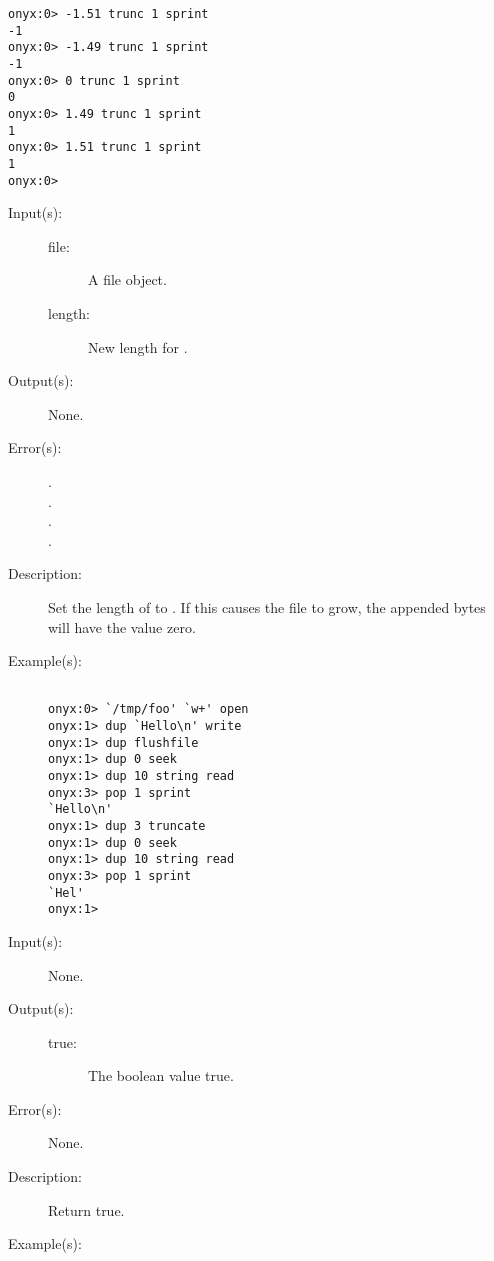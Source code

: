 \begin{description}
\begin{description}
\begin{verbatim}
onyx:0> -1.51 trunc 1 sprint
-1
onyx:0> -1.49 trunc 1 sprint
-1
onyx:0> 0 trunc 1 sprint
0
onyx:0> 1.49 trunc 1 sprint
1
onyx:0> 1.51 trunc 1 sprint
1
onyx:0>
		\end{verbatim}
	\end{description}
\label{systemdict:truncate}
\item[{\onyxop{file length}{truncate}{--}}: ]
	\begin{description}\item[]
	\item[Input(s): ]
		\begin{description}\item[]
		\item[file: ]
			A file object.
		\item[length: ]
			New length for .
		\end{description}
	\item[Output(s): ] None.
	\item[Error(s): ]
		\begin{description}\item[]
		\item[.]
		\item[.]
		\item[.]
		\item[.]
		\end{description}
	\item[Description: ]
		Set the length of  to .  If this
		causes the file to grow, the appended bytes will have the
		value zero.
	\item[Example(s): ]\begin{verbatim}

onyx:0> `/tmp/foo' `w+' open
onyx:1> dup `Hello\n' write
onyx:1> dup flushfile
onyx:1> dup 0 seek
onyx:1> dup 10 string read
onyx:3> pop 1 sprint
`Hello\n'
onyx:1> dup 3 truncate
onyx:1> dup 0 seek
onyx:1> dup 10 string read
onyx:3> pop 1 sprint
`Hel'
onyx:1>
		\end{verbatim}
	\end{description}
\label{systemdict:true}
\item[{\onyxop{--}{true}{true}}: ]
	\begin{description}\item[]
	\item[Input(s): ] None.
	\item[Output(s): ]
		\begin{description}\item[]
		\item[true: ]
			The boolean value true.
		\end{description}
	\item[Error(s): ] None.
	\item[Description: ]
		Return true.
	\item[Example(s): ]\begin{verbatim}


\end{verbatim}
\end{description}
\end{description}

